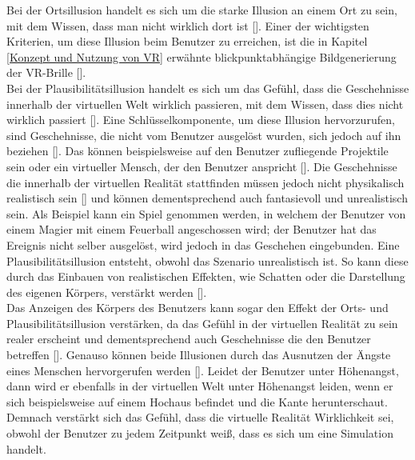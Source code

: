\documentclass[a4paper,12pt,oneside]{article}
\begin{document}
        Bei der 
        Ortsillusion handelt es sich um die starke Illusion an einem Ort zu sein, mit dem
        Wissen, dass man nicht wirklich dort ist [\cite{Slater2009}]. Einer der wichtigsten
        Kriterien, um diese Illusion beim Benutzer zu erreichen, ist die in Kapitel 
        \ref{Konzept und Nutzung von VR}
        erwähnte blickpunktabhängige Bildgenerierung der VR-Brille [\cite[18]{Dorner2013}]. \\
        Bei der Plausibilitätsillusion handelt
        es sich um das Gefühl, dass die Geschehnisse innerhalb der virtuellen Welt 
        wirklich passieren, mit dem Wissen, dass dies nicht wirklich passiert
        [\cite{Slater2009}]. Eine Schlüsselkomponente, um diese Illusion hervorzurufen,
        sind Geschehnisse, die nicht vom Benutzer ausgelöst wurden, sich jedoch auf ihn
        beziehen [\cite{Slater2009}]. Das können beispielsweise auf den Benutzer zufliegende
        Projektile sein oder ein virtueller Mensch, der den Benutzer anspricht
        [\cite[18-19]{Dorner2013}]. Die Geschehnisse die innerhalb der virtuellen Realität
        stattfinden müssen jedoch nicht physikalisch realistisch sein [\cite{Slater2009}]
        und können dementsprechend auch fantasievoll und unrealistisch sein. Als Beispiel kann
        ein Spiel genommen werden, in welchem der Benutzer von einem Magier mit einem 
        Feuerball angeschossen wird; der Benutzer hat das Ereignis nicht selber ausgelöst,
        wird jedoch in das Geschehen eingebunden. Eine Plausibilitätsillusion entsteht,
        obwohl das Szenario unrealistisch ist. So kann diese durch das
        Einbauen von realistischen Effekten, wie Schatten oder die Darstellung des eigenen
        Körpers, verstärkt werden [\cite{Slater2009}]. \\
        Das Anzeigen des Körpers des Benutzers
        kann sogar den Effekt der Orts- und Plausibilitätsillusion verstärken, da das
        Gefühl in der virtuellen Realität zu sein realer erscheint und 
        dementsprechend auch Geschehnisse die den
        Benutzer betreffen [\cite{Slater2009}]. Genauso können beide Illusionen durch das
        Ausnutzen der Ängste eines Menschen hervorgerufen werden [\cite{Slater2009}].
        Leidet der Benutzer unter Höhenangst, dann wird er ebenfalls in der virtuellen
        Welt unter Höhenangst leiden, wenn er sich beispielsweise auf einem Hochaus 
        befindet und die Kante herunterschaut. 
        Demnach verstärkt sich das Gefühl, dass die virtuelle Realität Wirklichkeit sei,
        obwohl der Benutzer zu jedem Zeitpunkt weiß, dass es sich um eine Simulation handelt.
\end{document}
